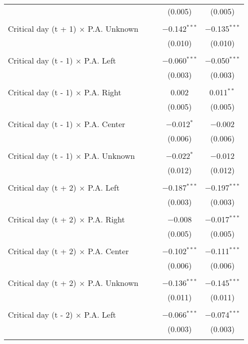 \documentclass[
]{article}
\begin{document}
\begin{table}[!htbp]
{\begin{tabular}{@{\extracolsep{5pt}}lcccc}
  &  &  & (0.005) & (0.005) \\ 
  & & & & \\ 
 Critical day (t + 1) $\times$ P.A. Unknown &  &  & $-$0.142$^{***}$ & $-$0.135$^{***}$ \\ 
  &  &  & (0.010) & (0.010) \\ 
  & & & & \\ 
 Critical day (t - 1) $\times$ P.A. Left &  &  & $-$0.060$^{***}$ & $-$0.050$^{***}$ \\ 
  &  &  & (0.003) & (0.003) \\ 
  & & & & \\ 
 Critical day (t - 1) $\times$ P.A. Right &  &  & 0.002 & 0.011$^{**}$ \\ 
  &  &  & (0.005) & (0.005) \\ 
  & & & & \\ 
 Critical day (t - 1) $\times$ P.A. Center &  &  & $-$0.012$^{*}$ & $-$0.002 \\ 
  &  &  & (0.006) & (0.006) \\ 
  & & & & \\ 
 Critical day (t - 1) $\times$ P.A. Unknown &  &  & $-$0.022$^{*}$ & $-$0.012 \\ 
  &  &  & (0.012) & (0.012) \\ 
  & & & & \\ 
 Critical day (t + 2) $\times$ P.A. Left &  &  & $-$0.187$^{***}$ & $-$0.197$^{***}$ \\ 
  &  &  & (0.003) & (0.003) \\ 
  & & & & \\ 
 Critical day (t + 2) $\times$ P.A. Right &  &  & $-$0.008 & $-$0.017$^{***}$ \\ 
  &  &  & (0.005) & (0.005) \\ 
  & & & & \\ 
 Critical day (t + 2) $\times$ P.A. Center &  &  & $-$0.102$^{***}$ & $-$0.111$^{***}$ \\ 
  &  &  & (0.006) & (0.006) \\ 
  & & & & \\ 
 Critical day (t + 2) $\times$ P.A. Unknown &  &  & $-$0.136$^{***}$ & $-$0.145$^{***}$ \\ 
  &  &  & (0.011) & (0.011) \\ 
  & & & & \\ 
 Critical day (t - 2) $\times$ P.A. Left &  &  & $-$0.066$^{***}$ & $-$0.074$^{***}$ \\ 
  &  &  & (0.003) & (0.003) \\ 
  & & & & \\ 

\end{tabular}}
\end{table}
\end{document}
